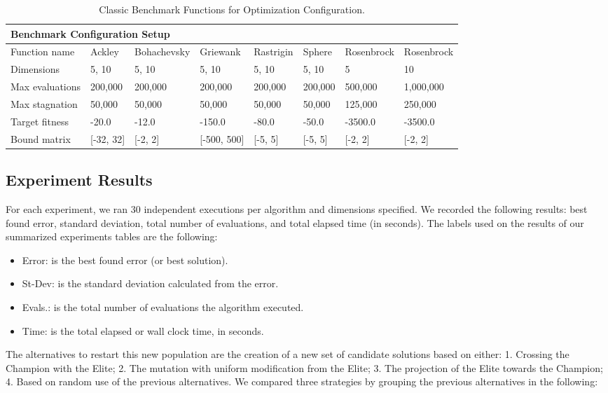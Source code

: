 \documentclass[graybox]{svmult}
\begin{document}
\begin{table}[]
    \scriptsize
    \centering
    \caption{Classic Benchmark Functions for Optimization Configuration.}\label{tab.benchmark_fun_config}
    \begin{tabular}{@{}llllllll@{}}
    \toprule
    \multicolumn{8}{l}{\textbf{Benchmark Configuration Setup}} \\ \midrule
    Function name & Ackley & Bohachevsky & Griewank & Rastrigin & Sphere & Rosenbrock & Rosenbrock \\
    Dimensions & 5, 10 & 5, 10 & 5, 10 & 5, 10 & 5, 10 & 5 & 10 \\
    Max evaluations & 200,000 & 200,000 & 200,000 & 200,000 & 200,000 & 500,000 & 1,000,000 \\
    Max stagnation & 50,000 & 50,000 & 50,000 & 50,000 & 50,000 & 125,000 & 250,000 \\
    Target fitness & -20.0 & -12.0 & -150.0 & -80.0 & -50.0 & -3500.0 & -3500.0 \\
    Bound matrix & {[}-32, 32{]} & {[}-2, 2{]} & {[}-500, 500{]} & {[}-5, 5{]} & {[}-5, 5{]} & {[}-2, 2{]} & {[}-2, 2{]} \\ \bottomrule
    \end{tabular}
    \end{table}


\subsection{Experiment Results}

For each experiment, we ran 30 independent executions per algorithm and
dimensions specified. We recorded the following results: best found error,
standard deviation, total number of evaluations, and total elapsed time (in
seconds). The labels used on the results of our summarized experiments tables
are the following:

\begin{itemize}
    \item   Error:       is the best found error (or best solution).
    \item   St-Dev:      is the standard deviation calculated from the error. 
    \item   Evals.:      is the total number of evaluations the algorithm executed.
    \item   Time:        is the total elapsed or wall clock time, in seconds. 
\end{itemize}

The alternatives to restart this new population are the creation of a new set
of candidate solutions based on either: 1. Crossing the Champion with the Elite;
2. The mutation with uniform modification from the Elite; 3. The
projection of the Elite towards the Champion; 4. Based on random use of the
previous alternatives. We compared three strategies by grouping the previous
alternatives in the following:
\end{document}

